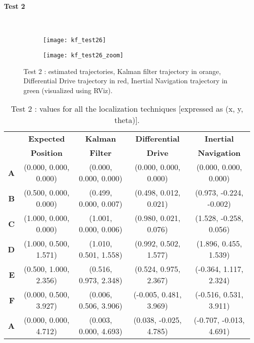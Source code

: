 \paragraph{Test 2}\mbox{}\\
\begin{figure}[!ht]
	\begin{subfigure}{0.35\textwidth}
		\texttt{[image: kf\_test26]}
	\end{subfigure}\hfil
	\begin{subfigure}{0.55\textwidth}
		\texttt{[image: kf\_test26\_zoom]}
	\end{subfigure}
	\captionsetup{justification=centering, margin=1.5cm}
	\centering
	\caption{Test 2 : estimated trajectories, Kalman filter trajectory in orange, Differential Drive trajectory in red, Inertial Navigation trajectory in green (visualized using RViz).}
	\centering
\end{figure}
\begin{table}[ht!]
	\centering
	\hspace*{-1.4cm}
	\begin{tabular}{rcccc}
		\toprule
		& \textbf{Expected} & \textbf{Kalman} & \textbf{Differential} & \textbf{Inertial}\\
		& \textbf{Position} & \textbf{Filter} & \textbf{Drive} & \textbf{Navigation}\\
		\midrule
		\textbf{A} & (0.000, 0.000, 0.000) & (0.000, 0.000, 0.000) & (0.000, 0.000, 0.000) & (0.000, 0.000, 0.000)\\
		\textbf{B} & (0.500, 0.000, 0.000) & (0.499, 0.000, 0.007) & (0.498, 0.012, 0.021) & (0.973, -0.224, -0.002)\\
		\textbf{C} & (1.000, 0.000, 0.000) & (1.001, 0.000, 0.006) & (0.980, 0.021, 0.076) & (1.528, -0.258, 0.056)\\
		\textbf{D} & (1.000, 0.500, 1.571) & (1.010, 0.501, 1.558) & (0.992, 0.502, 1.577) & (1.896, 0.455, 1.539)\\
		\textbf{E} & (0.500, 1.000, 2.356) & (0.516, 0.973, 2.348) & (0.524, 0.975, 2.367) & (-0.364, 1.117, 2.324)\\
		\textbf{F} & (0.000, 0.500, 3.927) & (0.006, 0.506, 3.906) & (-0.005, 0.481, 3.969) & (-0.516, 0.531, 3.911)\\
		\textbf{A} & (0.000, 0.000, 4.712) & (0.003, 0.000, 4.693) & (0.038, -0.025, 4.785) & (-0.707, -0.013, 4.691)\\
		\bottomrule
	\end{tabular}
	\hspace*{-1.4cm}
	\caption{Test 2 : values for all the localization techniques [expressed as (x, y, theta)].}
\end{table}
